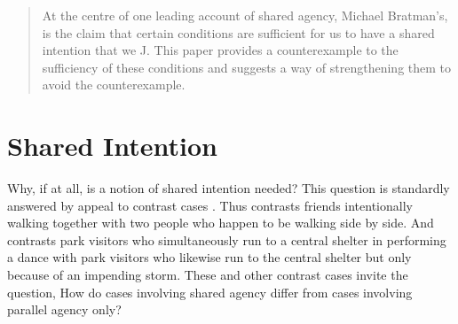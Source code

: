 \documentclass[12pt,\papersize]{extarticle}
\begin{document}
\setlength\footnotesep{1em}


\maketitle
\title{}

\begin{abstract}
\noindent
At the centre of one leading account of shared agency, Michael Bratman's, is the claim that certain conditions are sufficient for us to have a shared intention that we J.
This paper provides a counterexample to the sufficiency of these conditions and suggests a way of strengthening them to avoid the counterexample.
\end{abstract}

\section{Shared Intention}
Why, if at all, is a notion of shared intention needed? 
This question is standardly answered by appeal to contrast cases \citep[compare][p.\ 150]{Bratman:2009lv}.
Thus \citet{gilbert_walking_1990} contrasts friends intentionally walking together with two people who happen to be walking side by side. 
And \citet{Searle:1990em} contrasts park visitors who  simultaneously run to a central shelter in performing a dance with park visitors who likewise run to the central shelter but only because of an impending storm.
These and other contrast cases invite the question, 
How do cases involving shared agency differ from cases involving parallel agency only? 
\end{document}
